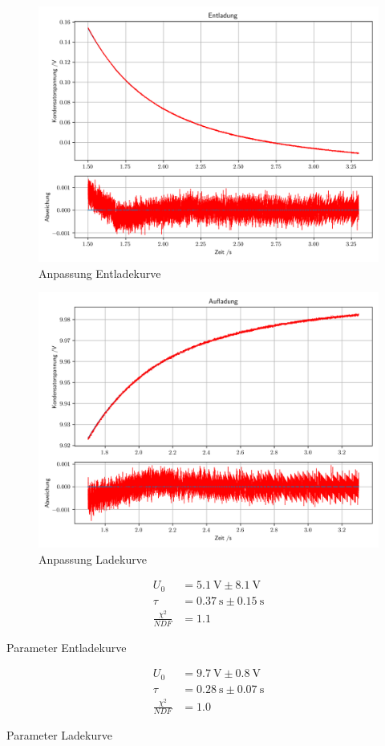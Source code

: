 \documentclass[12pt,twoside,a4paper]{scrartcl}
\begin{document}
				\begin{figure}[H]
					\centering
					\includegraphics[width = 0.8 \textwidth]{Plots/Capacitor/CapacitorEntladung.png}
					\caption{Anpassung Entladekurve}
				\end{figure}
				\begin{figure}[H]
					\centering
					\includegraphics[width = 0.8 \textwidth]{Plots/Capacitor/CapacitorAufladung.png}
					\caption{Anpassung Ladekurve}
				\end{figure}

				\begin{table}[H]
					\centering
					\begin{minipage}{0.4 \textwidth}
						\begin{align*}
							U_0 &= \SI{5.1}{\volt} \pm \SI{8.1}{\volt} \\
							\tau &= \SI{0.37}{\second} \pm \SI{0.15}{\second} \\
							\frac{\chi^2}{NDF} &= 1.1
						\end{align*}
						\caption{Parameter Entladekurve}
					\end{minipage}
					\begin{minipage}{0.4 \textwidth}
						 \begin{align*}
							 	U_0 &= \SI{9.7}{\volt} \pm \SI{0.8}{\volt}\\
							 	\tau &= \SI{0.28}{\second} \pm \SI{0.07}{\second}\\
								\frac{\chi^2}{NDF} &= 1.0
						 \end{align*}
						\caption{Parameter Ladekurve}
					\end{minipage}
				\end{table}
\end{document}
